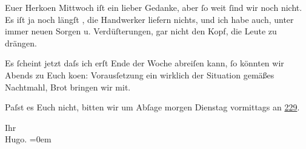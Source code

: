 \pstart
           Euer Herko{\geminationm}en Mittwoch iſt ein lieber
               Gedanke, aber ſo weit ſind wir noch nicht. Es iſt ja noch längſt \label{K_L02254-1v}\label{K_L02254-1}, die Handwerker liefern nichts, und ich habe auch, unter
               immer neuen Sorgen u. Verdüſterungen, gar nicht den Kopf, {\pb}die Leute zu drängen.\pend
           
\pstart
           Es ſcheint jetzt daſs ich erſt Ende der Woche abreiſen kann, ſo könnten wir \label{K_L02254-2v}\label{K_L02254-2}{ }Abends zu Euch ko{\geminationm}en: Vorausſetzung ein
               wirklich der Situation gemäßes Nachtmahl, Brot bringen wir mit.\pend
           
\pstart
           Paſst es Euch nicht, bitten wir um Abſage morgen Dienstag{ }vormittags an \uline{229}.\pend
           
\pstart
           Ihr{\\[\baselineskip]}\spacefill\mbox{Hugo.}\pend
           \leftskip=0em{}\endnumbering{}  
      